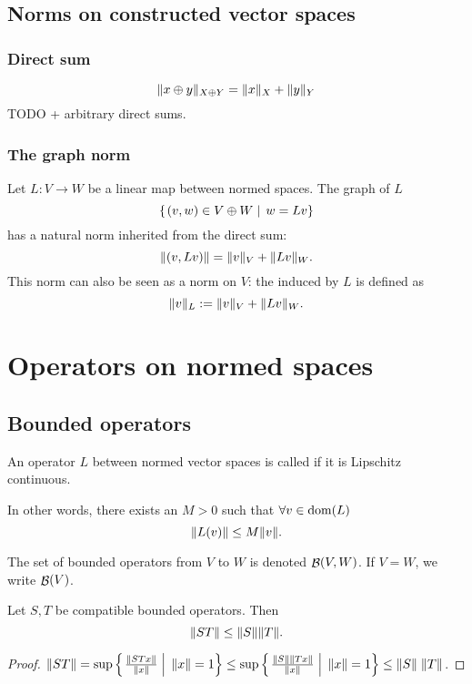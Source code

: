 \subsection{Norms on constructed vector spaces}
\subsubsection{Direct sum}
\[ \lVert x\oplus y\rVert_{X\oplus Y} = \lVert x\rVert_X + \lVert y\rVert_Y \]
TODO + arbitrary direct sums.
\subsubsection{The graph norm}
Let $L:V\to W$ be a linear map between normed spaces. The graph of $L$
\[ \left\{\left. (v,w)\in V\oplus W \;\right|\; w = Lv \right\} \]
has a natural norm inherited from the direct sum:
\[ \lVert(v,Lv)\rVert = \lVert v\rVert_V + \lVert Lv\rVert_W. \]
This norm can also be seen as a norm on $V$: the  induced by $L$ is defined as
\[ \lVert v\rVert_L := \lVert v\rVert_V + \lVert Lv\rVert_W. \]


\section{Operators on normed spaces}


\subsection{Bounded operators}
\begin{definition}
An operator $L$ between normed vector spaces is called  if it is Lipschitz continuous.

In other words, there exists an $M>0$ such that $\forall v\in \operatorname{dom}(L)$
\[ \lVert L(v)\rVert \leq M \lVert v\rVert. \]

The set of bounded operators from $V$ to $W$ is denoted $\mathop{\mathcal{B}}(V,W)$. If $V=W$, we write $\mathop{\mathcal{B}}(V)$.
\end{definition}

\begin{lemma}
Let $S,T$ be compatible bounded operators. Then
\[ \lVert ST\rVert \leq \lVert S\rVert\lVert T\rVert. \]
\end{lemma}
\begin{proof}
$\lVert ST\rVert = \sup\left\{\left. \frac{\lVert STx\rVert}{\lVert x\rVert} \;\right|\; \lVert x\rVert=1 \right\} \leq \sup\left\{\left. \frac{\lVert S\rVert\lVert Tx\rVert}{\lVert x\rVert} \;\right|\; \lVert x\rVert=1 \right\}\leq \lVert S\rVert\;\lVert T\rVert$.
\end{proof}

